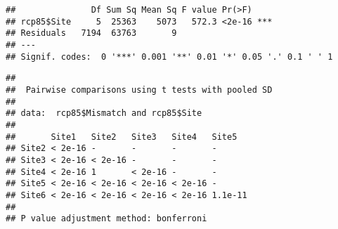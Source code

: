 \documentclass[
]{article}
\begin{document}
\begin{verbatim}
##               Df Sum Sq Mean Sq F value Pr(>F)    
## rcp85$Site     5  25363    5073   572.3 <2e-16 ***
## Residuals   7194  63763       9                   
## ---
## Signif. codes:  0 '***' 0.001 '**' 0.01 '*' 0.05 '.' 0.1 ' ' 1
\end{verbatim}

\begin{verbatim}
## 
##  Pairwise comparisons using t tests with pooled SD 
## 
## data:  rcp85$Mismatch and rcp85$Site 
## 
##       Site1   Site2   Site3   Site4   Site5  
## Site2 < 2e-16 -       -       -       -      
## Site3 < 2e-16 < 2e-16 -       -       -      
## Site4 < 2e-16 1       < 2e-16 -       -      
## Site5 < 2e-16 < 2e-16 < 2e-16 < 2e-16 -      
## Site6 < 2e-16 < 2e-16 < 2e-16 < 2e-16 1.1e-11
## 
## P value adjustment method: bonferroni
\end{verbatim}
\end{document}
